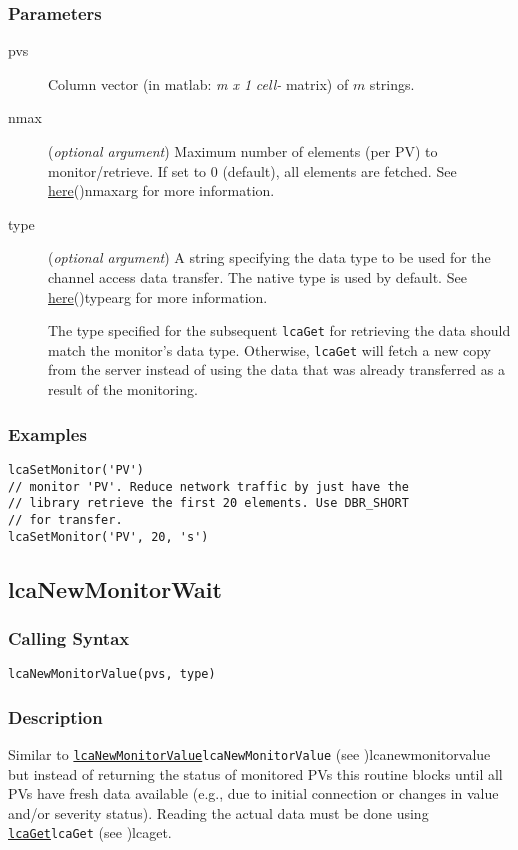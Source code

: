 \documentclass{article}
\newcommand{\com}[1]{{\tt #1}}
\newcommand{\pbrk}{\pagebreak[3]}
\newcommand{\comref}[2]{\hyperref[ref]{\com{#1}}{\com{#1} (see }{)}{#2}}
\newcommand{\ita}[1]{\emph{#1}}
\newcommand{\m}{$m$}
\newcommand{\mhack}{$m$} %
\newcommand{\mxl}{$m\times 1$}
\renewcommand{\m}{\ita{m}}
\newcommand{\mhack}{\ita{m}} %
\renewcommand{\mxl}{\ita{m x 1}}
\renewcommand{\pbrk}{}
\newcommand{\PVITEM}{
\item[pvs] Column vector (in matlab: \mxl{} \ita{cell-} matrix)
of \mhack{} strings.
}
\begin{document}
\subsubsection{Parameters}
\begin{description}
\PVITEM
\item[nmax]
(\ita{optional argument}) Maximum number of elements
(per PV) to monitor/retrieve. If set to 0 (default), all elements are fetched.
See \hyperref[ref]{here}{(}{)}{nmaxarg} for more information.
\item[type]
(\ita{optional argument}) A string specifying the
data type to be used for the channel access data transfer. The
native type is used by default.
See \hyperref[ref]{here}{(}{)}{typearg} for more information.

The type specified for the subsequent \com{lcaGet} for retrieving
the data should match the monitor's data type. Otherwise, \com{lcaGet}
will fetch a new copy from the server instead of using the data that
was already transferred as a result of the monitoring.
\end{description}
\subsubsection{Examples}
\begin{verbatim}
lcaSetMonitor('PV')
// monitor 'PV'. Reduce network traffic by just have the
// library retrieve the first 20 elements. Use DBR_SHORT
// for transfer.
lcaSetMonitor('PV', 20, 's')
\end{verbatim}

\pbrk
\subsection{lcaNewMonitorWait}
\label{lcanewmonitorwait}
\subsubsection{Calling Syntax}
\begin{verbatim}
lcaNewMonitorValue(pvs, type)
\end{verbatim}
\subsubsection{Description}
Similar to \comref{lcaNewMonitorValue}{lcanewmonitorvalue} but instead of
returning the status of monitored PVs this routine blocks until all PVs
have fresh data available (e.g., due to initial connection or changes in
value and/or severity status).
Reading the actual data must be done using \comref{lcaGet}{lcaget}.
\end{document}

